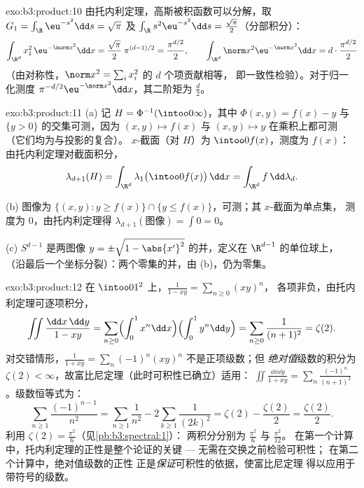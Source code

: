 \begin{solution}{exo:b3:product:10}
由托内利定理，高斯被积函数可以分解，取 $G_1 =
\int_\R\eu^{-s^2}\dd s = \sqrt\pi$ 及 $\int_\R
s^2\eu^{-s^2}\dd s = \frac{\sqrt\pi}2$（分部积分）：
\[
\int_{\R^d}x_1^2\,\eu^{-\norm x^2}\dd x =
\frac{\sqrt\pi}2\;\pi^{(d-1)/2} = \frac{\pi^{d/2}}2,
\qquad
\int_{\R^d}\norm x^2\eu^{-\norm x^2}\dd x =
d\cdot\frac{\pi^{d/2}}2
\]
（由对称性，$\norm x^2 = \sum_ix_i^2$ 的 $d$ 个项贡献相等，
即一致性检验）。对于归一化测度
$\pi^{-d/2}\eu^{-\norm x^2}\dd x$，其二阶矩为
$\frac d2$。
\end{solution}

\begin{solution}{exo:b3:product:11}
(a) 记 $H = \Phi^{-1}(\intoo0\infty)$，其中 $\Phi(x, y) = f(x) -
y$ 与 $\{y > 0\}$ 的交集可测，因为 $(x, y)
\mapsto f(x)$ 与 $(x,y)\mapsto y$ 在乘积上都可测
（它们均为与投影的复合）。
$x$-截面（对 $H$）为 $\intoo0{f(x)}$，测度为 $f(x)$：
由托内利定理对截面积分，
\[
\lambda_{d+1}(H) = \int_{\R^d}\lambda_1\bigl(\intoo0{f(x)}
\bigr)\,\dd x = \int_{\R^d}f\,\dd\lambda_d .
\]

(b) 图像为 $\{(x,y) : y \geq f(x)\} \cap \{y \leq
f(x)\}$，可测；其 $x$-截面为单点集，
测度为 $0$，由托内利定理得 $\lambda_{d+1}(\text{图像}) =
\int 0 = 0$。

(c) $S^{d-1}$ 是两图像 $y =
\pm\sqrt{1 - \abs{x'}^2}$ 的并，定义在 $\R^{d-1}$ 的单位球上，
（沿最后一个坐标分裂）：两个零集的并，由
(b)，仍为零集。
\end{solution}

\begin{solution}{exo:b3:product:12}
在 $\intoo01^2$ 上，$\frac1{1 - xy} = \sum_{n\geq0}(xy)^n$，
各项非负，由托内利定理可逐项积分，
\[
\iint\frac{\dd x\,\dd y}{1 - xy}
= \sum_{n\geq0}\Bigl(\int_0^1x^n\dd x\Bigr)
\Bigl(\int_0^1y^n\dd y\Bigr)
= \sum_{n\geq0}\frac1{(n+1)^2} = \zeta(2) .
\]
对交错情形，$\frac1{1 + xy} =
\sum_n(-1)^n(xy)^n$ 不是正项级数；但
\emph{绝对值}级数的积分为 $\zeta(2) <
\infty$，故富比尼定理（此时可积性已确立）适用：
$\iint\frac{\dd x\dd y}{1 + xy} =
\sum_n\frac{(-1)^n}{(n+1)^2}$。级数恒等式为：
\[
\sum_{n\geq1}\frac{(-1)^{n-1}}{n^2}
= \sum_{n\geq1}\frac1{n^2} - 2\sum_{k\geq1}\frac1{(2k)^2}
= \zeta(2) - \frac{\zeta(2)}2 = \frac{\zeta(2)}2 .
\]
利用 $\zeta(2) = \frac{\pi^2}6$（见\cref{pb:b3:spectral:1}）：
两积分分别为 $\frac{\pi^2}6$ 与 $\frac{\pi^2}{12}$。
在第一个计算中，托内利定理的正性是整个论证的关键
--- 无需在交换之前检验可积性；
在第二个计算中，绝对值级数的正性
正是\emph{保证}可积性的依据，使富比尼定理
得以应用于带符号的级数。
\end{solution}

